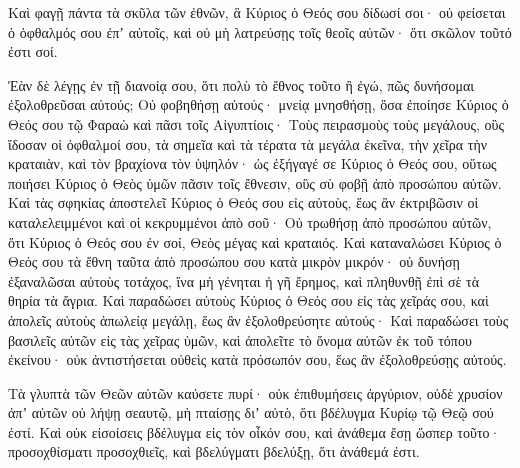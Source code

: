 {\par }{\PP {}Καὶ φαγῇ πάντα τὰ σκῦλα τῶν ἐθνῶν, ἃ Κύριος ὁ Θεός σου δίδωσί σοι· οὐ φείσεται ὁ ὀφθαλμός σου ἐπʼ αὐτοῖς, καὶ οὐ μὴ λατρεύσῃς τοῖς θεοῖς αὐτῶν· ὅτι σκῶλον τοῦτό ἐστι σοί.
\par }{\PP {}Ἐὰν δὲ λέγῃς ἐν τῇ διανοίᾳ σου, ὅτι πολὺ τὸ ἔθνος τοῦτο ἢ ἐγώ, πῶς δυνήσομαι ἐξολοθρεῦσαι αὐτούς;
Οὐ φοβηθήσῃ αὐτούς· μνείᾳ μνησθήσῃ, ὅσα ἐποίησε Κύριος ὁ Θεός σου τῷ Φαραὼ καὶ πᾶσι τοῖς Αἰγυπτίοις·
Τοὺς πειρασμοὺς τοὺς μεγάλους, οὓς ἴδοσαν οἱ ὀφθαλμοί σου, τὰ σημεῖα καὶ τὰ τέρατα τὰ μεγάλα ἐκεῖνα, τὴν χεῖρα τὴν κραταιὰν, καὶ τὸν βραχίονα τὸν ὑψηλόν· ὡς ἐξήγαγέ σε Κύριος ὁ Θεός σου, οὕτως ποιήσει Κύριος ὁ Θεὸς ὑμῶν πᾶσιν τοῖς ἔθνεσιν, οὓς σὺ φοβῇ ἀπὸ προσώπου αὐτῶν.
Καὶ τὰς σφηκίας ἀποστελεῖ Κύριος ὁ Θεός σου εἰς αὐτοὺς, ἕως ἂν ἐκτριβῶσιν οἱ καταλελειμμένοι καὶ οἱ κεκρυμμένοι ἀπὸ σοῦ·
Οὐ τρωθήσῃ ἀπὸ προσώπου αὐτῶν, ὅτι Κύριος ὁ Θεός σου ἐν σοί, Θεὸς μέγας καὶ κραταιός.
Καὶ καταναλώσει Κύριος ὁ Θεός σου τὰ ἔθνη ταῦτα ἀπὸ προσώπου σου κατὰ μικρὸν μικρόν· οὐ δυνήσῃ ἐξαναλῶσαι αὐτοὺς τοτάχος, ἵνα μὴ γένηται ἡ γῆ ἔρημος, καὶ πληθυνθῇ ἐπὶ σὲ τὰ θηρία τὰ ἄγρια.
Καὶ παραδώσει αὐτοὺς Κύριος ὁ Θεός σου εἰς τὰς χεῖράς σου, καὶ ἀπολεῖς αὐτοὺς ἀπωλείᾳ μεγάλῃ, ἕως ἂν ἐξολοθρεύσητε αὐτούς·
Καὶ παραδώσει τοὺς βασιλεῖς αὐτῶν εἰς τὰς χεῖρας ὑμῶν, καὶ ἀπολεῖτε τὸ ὄνομα αὐτῶν ἐκ τοῦ τόπου ἐκείνου· οὐκ ἀντιστήσεται οὐθεὶς κατὰ πρόσωπόν σου, ἕως ἂν ἐξολοθρεύσῃς αὐτούς.
\par }{\PP {}Τὰ γλυπτὰ τῶν Θεῶν αὐτῶν καύσετε πυρί· οὐκ ἐπιθυμήσεις ἀργύριον, οὐδὲ χρυσίον ἀπʼ αὐτῶν οὐ λήψῃ σεαυτῷ, μὴ πταίσῃς διʼ αὐτὸ, ὅτι βδέλυγμα Κυρίῳ τῷ Θεῷ σού ἐστί.
Καὶ οὐκ εἰσοίσεις βδέλυγμα εἰς τὸν οἶκόν σου, καὶ ἀνάθεμα ἔσῃ ὥσπερ τοῦτο· προσοχθίσματι προσοχθιεῖς, καὶ βδελύγματι βδελύξῃ, ὅτι ἀνάθεμά ἐστι.

}
